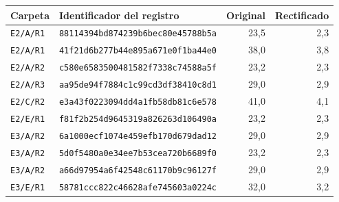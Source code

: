 \begin{tabular}{llrr}
\hline
Carpeta & Identificador del registro & Original & Rectificado \\
\hline
\texttt{E2/A/R1} & \texttt{88114394bd874239b6bec80e45788b5a} & 23{,}5 & 2{,}3 \\
\texttt{E2/A/R1} & \texttt{41f21d6b277b44e895a671e0f1ba44e0} & 38{,}0 & 3{,}8 \\
\texttt{E2/A/R2} & \texttt{c580e6583500481582f7338c74588a5f} & 23{,}2 & 2{,}3 \\
\texttt{E2/A/R3} & \texttt{aa95de94f7884c1c99cd3df38410c8d1} & 29{,}0 & 2{,}9 \\
\texttt{E2/C/R2} & \texttt{e3a43f0223094dd4a1fb58db81c6e578} & 41{,}0 & 4{,}1 \\
\texttt{E2/E/R1} & \texttt{f81f2b254d9645319a826263d106490a} & 23{,}2 & 2{,}3 \\
\texttt{E3/A/R2} & \texttt{6a1000ecf1074e459efb170d679dad12} & 29{,}0 & 2{,}9 \\
\texttt{E3/A/R2} & \texttt{5d0f5480a0e34ee7b53cea720b6689f0} & 23{,}2 & 2{,}3 \\
\texttt{E3/A/R2} & \texttt{a66d97954a6f42548c61170b9c96127f} & 29{,}0 & 2{,}9 \\
\texttt{E3/E/R1} & \texttt{58781ccc822c46628afe745603a0224c} & 32{,}0 & 3{,}2 \\
\hline
\end{tabular}
